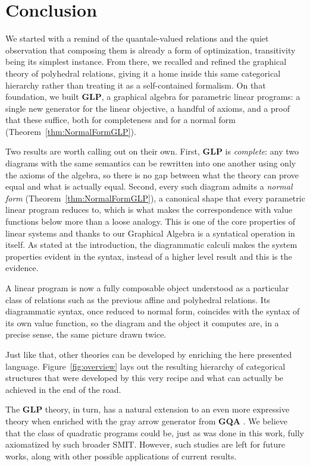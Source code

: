 \chapter{Conclusion}

We started with a remind of the quantale-valued relations
and the quiet observation that composing them is already a form of optimization,
transitivity being its simplest instance. From there, we recalled and refined the graphical theory
of polyhedral relations, giving it a home inside this same categorical
hierarchy rather than treating it as a self-contained formalism. On that
foundation, we built \textbf{GLP}, a graphical algebra for parametric linear
programs: a single new generator for the linear objective, a handful of
axioms, and a proof that these suffice, both for completeness and for a
normal form (Theorem~\ref{thm:NormalFormGLP}).

Two results are worth calling out on their own. First, \textbf{GLP} is
\emph{complete}: any two diagrams with the same semantics can be rewritten
into one another using only the axioms of the algebra, so there is no gap
between what the theory can prove equal and what is actually equal. Second,
every such diagram admits a \emph{normal form}
(Theorem~\ref{thm:NormalFormGLP}), a canonical shape that every parametric
linear program reduces to, which is what makes the correspondence with value
functions below more than a loose analogy. This is one of the 
core properties of linear systems and thanks to our Graphical Algebra is 
a syntatical operation in itself. As stated at the introduction,
the diagrammatic calculi makes the system properties evident in the syntax, 
instead of a higher level result and this is the evidence.

A linear program is now a fully composable object understood as a particular
class of relations such as the previous affine and polyhedral relations.
Its diagrammatic syntax, once reduced to normal form, coincides
with the syntax of its own value function, so the diagram and the object it
computes are, in a precise sense, the same picture drawn twice.

Just like that, other theories can be developed by enriching the here presented
language. Figure~\ref{fig:overview} lays out the resulting hierarchy of categorical
structures that were developed by this very recipe and what can actually be achieved
in the end of the road.

The \textbf{GLP} theory, in turn, has a natural extension to an even more expressive theory
when enriched with the gray arrow generator from \textbf{GQA} \cite{stein2024gqa}.
We believe that the class of quadratic programs could be, just as was done in this work,
fully axiomatized by such broader SMIT. However, such studies are left for future works,
along with other possible applications of current results.


